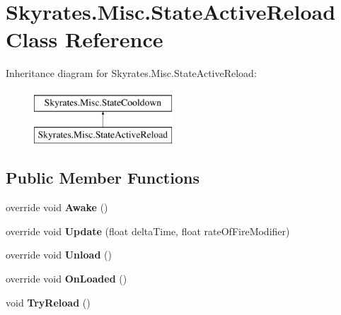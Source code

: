 \hypertarget{class_skyrates_1_1_misc_1_1_state_active_reload}{\section{Skyrates.\-Misc.\-State\-Active\-Reload Class Reference}
\label{class_skyrates_1_1_misc_1_1_state_active_reload}
}
Inheritance diagram for Skyrates.\-Misc.\-State\-Active\-Reload\-:\begin{figure}[H]
\begin{center}
\leavevmode
\includegraphics[height=2.000000cm]{class_skyrates_1_1_misc_1_1_state_active_reload}
\end{center}
\end{figure}
\subsection*{Public Member Functions}
\begin{DoxyCompactItemize}
\item 
\hypertarget{class_skyrates_1_1_misc_1_1_state_active_reload_a597feb9e4e50a6a220a18ff26e3a83c7}{override void {\bfseries Awake} ()}\label{class_skyrates_1_1_misc_1_1_state_active_reload_a597feb9e4e50a6a220a18ff26e3a83c7}

\item 
\hypertarget{class_skyrates_1_1_misc_1_1_state_active_reload_a750982d0355bacfd9182942df6d346d4}{override void {\bfseries Update} (float delta\-Time, float rate\-Of\-Fire\-Modifier)}\label{class_skyrates_1_1_misc_1_1_state_active_reload_a750982d0355bacfd9182942df6d346d4}

\item 
\hypertarget{class_skyrates_1_1_misc_1_1_state_active_reload_a1ed201c327cc97fe84debddf324127d6}{override void {\bfseries Unload} ()}\label{class_skyrates_1_1_misc_1_1_state_active_reload_a1ed201c327cc97fe84debddf324127d6}

\item 
\hypertarget{class_skyrates_1_1_misc_1_1_state_active_reload_a1eb782166f79982b262104a7f79e1521}{override void {\bfseries On\-Loaded} ()}\label{class_skyrates_1_1_misc_1_1_state_active_reload_a1eb782166f79982b262104a7f79e1521}

\item 
\hypertarget{class_skyrates_1_1_misc_1_1_state_active_reload_ae7fdc2a08957bb4464dba6358dfb6528}{void {\bfseries Try\-Reload} ()}\label{class_skyrates_1_1_misc_1_1_state_active_reload_ae7fdc2a08957bb4464dba6358dfb6528}

\end{DoxyCompactItemize}
